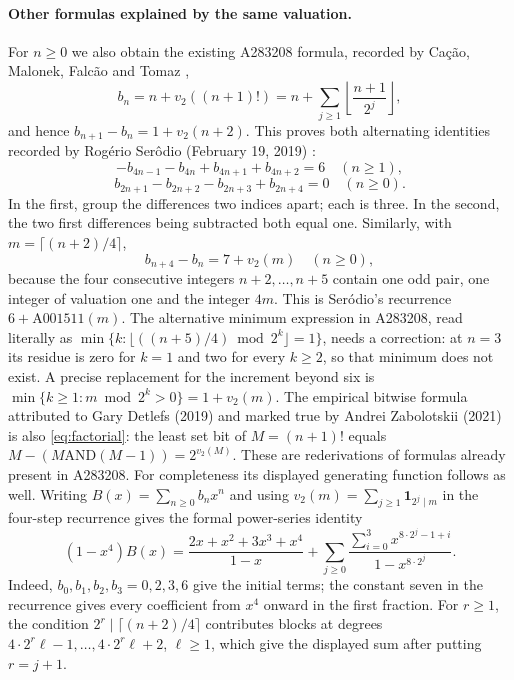 \documentclass[11pt]{article}
\begin{document}
\paragraph{Other formulas explained by the same valuation.}
For $n\geq0$ we also obtain the existing A283208 formula,
recorded by Ca\c{c}\~ao, Malonek, Falc\~ao and Tomaz
\cite[Section 2, pp.~4 and 7]{cacao2018},
\begin{equation}\label{eq:factorial}
 b_n=n+v_2((n+1)!)
     =n+\sum_{j\geq1}\left\lfloor\frac{n+1}{2^j}\right\rfloor,
\end{equation}
and hence $b_{n+1}-b_n=1+v_2(n+2)$.
This proves both alternating identities recorded by Rog\'erio
Ser\^odio (February 19, 2019) \cite{vietoris}:
\[
 -b_{4n-1}-b_{4n}+b_{4n+1}+b_{4n+2}=6\quad(n\geq1),
\]
\[
 b_{2n+1}-b_{2n+2}-b_{2n+3}+b_{2n+4}=0\quad(n\geq0).
\]
In the first, group the differences two indices apart; each is three.
In the second, the two first differences being subtracted both equal one.
Similarly, with $m=\lceil(n+2)/4\rceil$,
\[
 b_{n+4}-b_n=7+v_2(m)\quad(n\geq0),
\]
because the four consecutive integers $n+2,\ldots,n+5$ contain
one odd pair, one integer of valuation one and the integer $4m$.
This is Ser\'odio's recurrence $6+\mathrm{A001511}(m)$.
The alternative minimum expression in A283208, read literally as
$\min\{k:\lfloor((n+5)/4)\bmod2^k\rfloor=1\}$, needs a correction:
at $n=3$ its residue is zero for $k=1$ and two for every $k\geq2$,
so that minimum does not exist. A precise replacement for the
increment beyond six is
$\min\{k\geq1:m\bmod2^k>0\}=1+v_2(m)$.
The empirical bitwise formula attributed to Gary Detlefs (2019)
and marked true by Andrei Zabolotskii (2021) is also
\eqref{eq:factorial}: the least set bit of $M=(n+1)!$ equals
$M-(M\mathbin{\mathrm{AND}}(M-1))=2^{v_2(M)}$.
These are rederivations of formulas already present in A283208.
For completeness its displayed generating function follows as well.
Writing $B(x)=\sum_{n\geq0}b_nx^n$ and using
$v_2(m)=\sum_{j\geq1}\mathbf{1}_{2^j\mid m}$ in the four-step
recurrence gives the formal power-series identity
\[
 (1-x^4)B(x)=\frac{2x+x^2+3x^3+x^4}{1-x}
 +\sum_{j\geq0}\frac{\sum_{i=0}^3x^{8\cdot2^j-1+i}}{1-x^{8\cdot2^j}}.
\]
Indeed, $b_0,b_1,b_2,b_3=0,2,3,6$ give the initial terms;
the constant seven in the recurrence gives every coefficient from
$x^4$ onward in the first fraction. For $r\geq1$, the condition
$2^r\mid\lceil(n+2)/4\rceil$ contributes blocks at degrees
$4\cdot2^r\ell-1,\ldots,4\cdot2^r\ell+2$, $\ell\geq1$,
which give the displayed sum after putting $r=j+1$.
\end{document}
